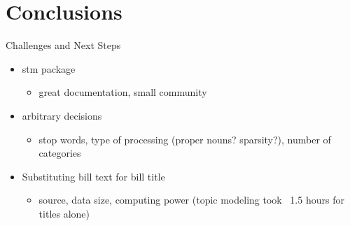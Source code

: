 \documentclass[12pt]{beamer}
\begin{document}
\section{Conclusions}
\begin{frame}{Challenges and Next Steps}
	\begin{itemize}
		\item stm package
			\begin{itemize}
				\item great documentation, small community
			\end{itemize}
		\item arbitrary decisions
			\begin{itemize}
			\item stop words, type of processing (proper nouns? sparsity?), number 				of categories
			\end{itemize}
		\item Substituting bill text for bill title
			\begin{itemize}
				\item source, data size, computing power (topic modeling took ~1.5 						hours for titles alone)
			\end{itemize}
	\end{itemize}
\end{frame}
\end{document}
